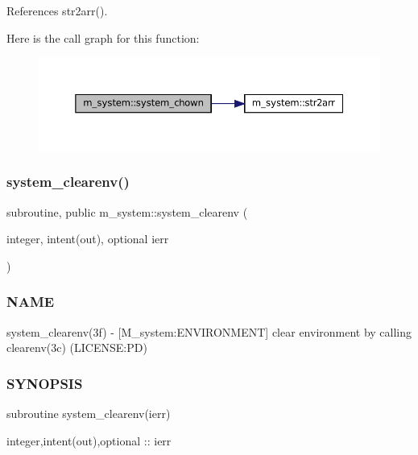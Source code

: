 References str2arr().

Here is the call graph for this function\+:
\nopagebreak
\begin{figure}[H]
\begin{center}
\leavevmode
\includegraphics[width=350pt]{namespacem__system_a3353c1cff032fcfe2985a69f10038ddd_cgraph}
\end{center}
\end{figure}
\mbox{\label{namespacem__system_a9c34787b170ab8d41000d7c3acb60736}} 
\subsubsection{\texorpdfstring{system\+\_\+clearenv()}{system\_clearenv()}}
{\footnotesize\ttfamily subroutine, public m\+\_\+system\+::system\+\_\+clearenv (\begin{DoxyParamCaption}\item[{integer, intent(out), optional}]{ierr }\end{DoxyParamCaption})}



\subsubsection*{N\+A\+ME}

system\+\_\+clearenv(3f) -\/ \mbox{[}M\+\_\+system\+:E\+N\+V\+I\+R\+O\+N\+M\+E\+NT\mbox{]} clear environment by calling clearenv(3c) (L\+I\+C\+E\+N\+SE\+:PD) 

\subsubsection*{S\+Y\+N\+O\+P\+S\+IS}

\begin{DoxyVerb}subroutine system_clearenv(ierr)

 integer,intent(out),optional :: ierr
\end{DoxyVerb}


